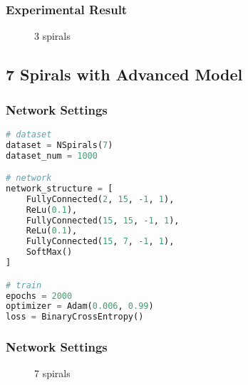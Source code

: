 \subsubsection{Experimental Result}
\begin{figure}[!ht]
    \centering
    \qquad
    \qquad
    \qquad
    \caption{3 spirals}
\end{figure}

\newpage
\subsection{7 Spirals with Advanced Model}
\subsubsection{Network Settings}
\begin{lstlisting}[language=Python]
# dataset
dataset = NSpirals(7)
dataset_num = 1000

# network
network_structure = [
    FullyConnected(2, 15, -1, 1),
    ReLu(0.1),
    FullyConnected(15, 15, -1, 1),
    ReLu(0.1),
    FullyConnected(15, 7, -1, 1),
    SoftMax()
]

# train
epochs = 2000
optimizer = Adam(0.006, 0.99)
loss = BinaryCrossEntropy()
\end{lstlisting}

\subsubsection{Network Settings}
\begin{figure}[!ht]
    \centering
    \qquad
    \qquad
    \qquad
    \caption{7 spirals}
\end{figure}

